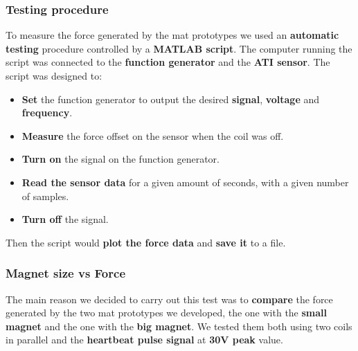 \subsubsection{Testing procedure}
To measure the force generated by the mat prototypes we used an \textbf{automatic testing} procedure controlled by a \textbf{MATLAB script}.
The computer running the script was connected to the \textbf{function generator} and the \textbf{ATI sensor}.
The script was designed to:
\begin{itemize}
    \item \textbf{Set} the function generator to output the desired \textbf{signal}, \textbf{voltage} and \textbf{frequency}.
    \item \textbf{Measure} the force offset on the sensor when the coil was off.
    \item \textbf{Turn on} the signal on the function generator.
    \item \textbf{Read the sensor data} for a given amount of seconds, with a given number of samples.
    \item \textbf{Turn off} the signal.
\end{itemize}
Then the script would \textbf{plot the force data} and \textbf{save it} to a file.

\subsubsection{Magnet size vs Force}
\label{subsubsec: Magnet_size_vs_Force}
The main reason we decided to carry out this test was to \textbf{compare} the force generated by the two mat prototypes we developed, the one with the \textbf{small magnet} and the one with the \textbf{big magnet}.
We tested them both using two coils in parallel and the \textbf{heartbeat pulse signal} at \textbf{30V peak} value.

